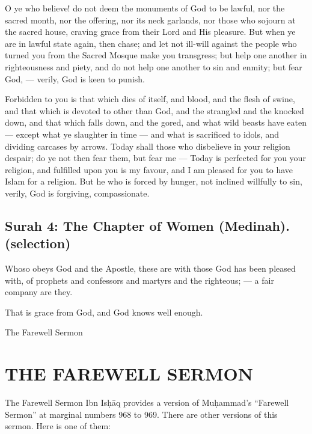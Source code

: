 \documentclass[fontsize=14pt, letterpaper, notitlepage, openany, DIV=12]{scrbook} %
\begin{document}
\noindent[5:2]
O ye who believe! do not deem the monuments of God to be lawful, nor the sacred
month, nor the offering, nor its neck garlands, nor those who sojourn at the sacred house, craving
grace from their Lord and His pleasure. But when ye are in lawful state again, then chase; and let
not ill-will against the people who turned you from the Sacred Mosque make you transgress; but
help one another in righteousness and piety, and do not help one another to sin and enmity; but
fear God, --- verily, God is keen to punish.

\noindent[5:3]
Forbidden to you is that which dies of itself, and blood, and the flesh of swine, and that
which is devoted to other than God, and the strangled and the knocked down, and that which
falls down, and the gored, and what wild beasts have eaten --- except what ye slaughter in time
--- and what is sacrificed to idols, and dividing carcases by arrows. Today shall those who
disbelieve in your religion despair; do ye not then fear them, but fear me --- Today is perfected
for you your religion, and fulfilled upon you is my favour, and I am pleased for you to have
Islam for a religion. But he who is forced by hunger, not inclined willfully to sin, verily, God is
forgiving, compassionate.


\section[Surah 4: The Chapter of Women (Medinah).]{Surah 4: The Chapter of Women (Medinah).\\ (selection)}


\noindent[4:69]
Whoso obeys God and the Apostle, these are with those God has been pleased with, of
prophets and confessors and martyrs and the righteous; --- a fair company are they.

\noindent[4:70]
That is grace from God, and God knows well enough.

\clearpage

\begin{center}
  {\Huge
    The Farewell Sermon
  }
\end{center}
\clearpage

\clearpage

\chapter{THE FAREWELL SERMON}


The Farewell Sermon Ibn Isḥāq provides a version of Muḥammad's ``Farewell Sermon'' at
marginal numbers 968 to 969. There are other versions of this sermon. Here is one of them:
\end{document}
